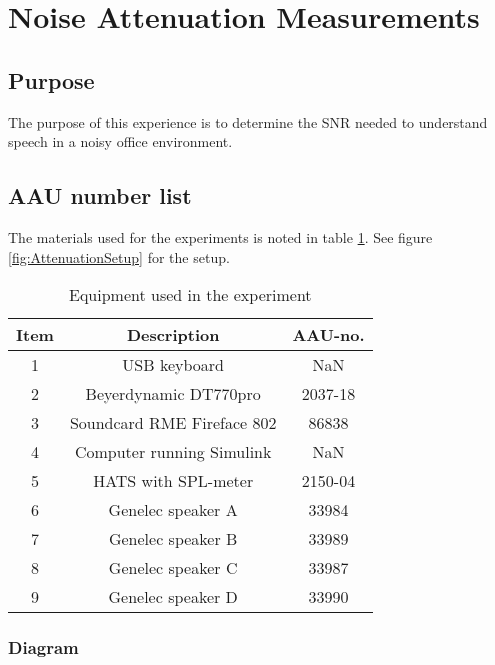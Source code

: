 \section{Noise Attenuation Measurements}

\subsection{Purpose}

The purpose of this experience is to determine the SNR needed to understand speech in a noisy office environment. 

\subsection{AAU number list}
The materials used for the experiments is noted in table \ref{tab:UsedEquipmentListningAttenuation}. See figure \ref{fig:AttenuationSetup} for the setup.

\begin{table}[h]
	\centering
	
	\begin{tabular}{ c c c } \toprule
		{Item} & {Description} & {AAU-no}. \\ \bottomrule 
		1      	&  USB keyboard							& NaN		\\
		2      	&  Beyerdynamic DT770pro				& 2037-18	\\
		3      	&  Soundcard RME Fireface 802           & 86838		\\
		4      	&  Computer	running Simulink			& NaN		\\  
		5		&  HATS with SPL-meter				& 2150-04	\\
		6      	&  Genelec speaker A					& 33984		\\
		7      	&  Genelec speaker B					& 33989		\\
		8      	&  Genelec speaker C					& 33987		\\
		9      	&  Genelec speaker D					& 33990		\\ \bottomrule 
	\end{tabular}
	\caption{Equipment used in the experiment}
	\label{tab:UsedEquipmentListningAttenuation}
\end{table}



\subsubsection{Diagram}

